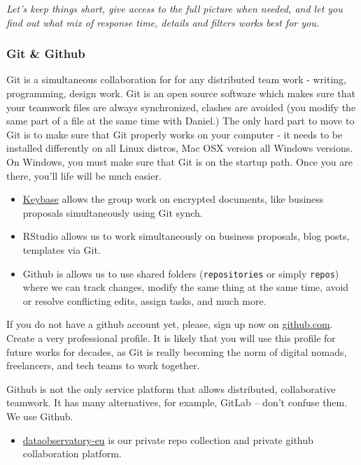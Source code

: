 \documentclass[
  fontsize=13pt,
  english,
  a4paper,
  openany, a4paper, oneside]{article}
\providecommand{\tightlist}{%
  \setlength{\itemsep}{0pt}\setlength{\parskip}{0pt}}
\begin{document}
\emph{Let's keep things short, give access to the full picture when needed, and let you find out what mix of response time, details and filters works best for you.}

\hypertarget{github}{%
\subsubsection{Git \& Github}\label{github}}

Git is a simultaneous collaboration for for any distributed team work - writing, programming, design work. Git is an open source software which makes sure that your teamwork files are always synchronized, clashes are avoided (you modify the same part of a file at the same time with Daniel.) The only hard part to move to Git is to make sure that Git properly works on your computer - it needs to be installed differently on all Linux distros, Mac OSX version all Windows versions. On Windows, you must make sure that Git is on the startup path. Once you are there, you'll life will be much easier.

\begin{itemize}
\item
  \protect\hyperlink{keybase}{Keybase} allows the group work on encrypted documents, like business proposals simultaneously using Git synch.
\item
  RStudio allows us to work simultaneously on business proposals, blog posts, templates via Git.
\item
  Github is allows us to use shared folders (\texttt{repositories} or simply \texttt{repos}) where we can track changes, modify the same thing at the same time, avoid or resolve conflicting edits, assign tasks, and much more.
\end{itemize}

If you do not have a github account yet, please, sign up now on \href{https://github.com/}{github.com}. Create a very professional profile. It is likely that you will use this profile for future works for decades, as Git is really becoming the norm of digital nomads, freelancers, and tech teams to work together.

Github is not the only service platform that allows distributed, collaborative teamwork. It has many alternatives, for example, GitLab -- don't confuse them. We use Github.

\begin{itemize}
\tightlist
\item
  \href{https://github.com/dataobservatory-eu}{dataobservatory-eu} is our private repo collection and private github collaboration platform.
\end{itemize}
\end{document}
